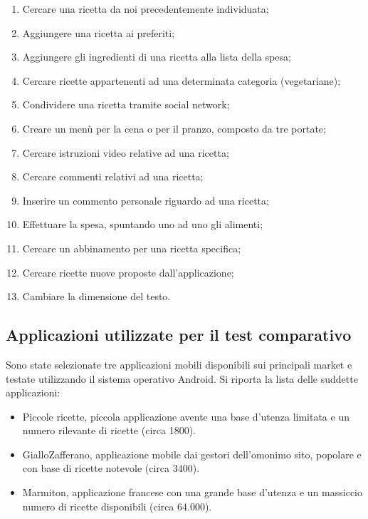 \begin{enumerate}
	\item Cercare una ricetta da noi precedentemente individuata;
	\item Aggiungere una ricetta ai preferiti;
	\item Aggiungere gli ingredienti di una ricetta alla lista della spesa;
	\item Cercare ricette appartenenti ad una determinata categoria
		(vegetariane);
	\item Condividere una ricetta tramite social network;
	\item Creare un menù per la cena o per il pranzo, composto da tre portate;
	\item Cercare istruzioni video relative ad una ricetta;
	\item Cercare commenti relativi ad una ricetta;
	\item Inserire un commento personale riguardo ad una ricetta;
	\item Effettuare la spesa, spuntando uno ad uno gli alimenti;
	\item Cercare un abbinamento per una ricetta specifica;
	\item Cercare ricette nuove proposte dall'applicazione;
	\item Cambiare la dimensione del testo.
\end{enumerate}

\subsection{Applicazioni utilizzate per il test comparativo}
Sono state selezionate tre applicazioni mobili disponibili sui principali market
e testate utilizzando il sistema operativo Android.  Si riporta la lista delle
suddette applicazioni:
\begin{itemize}
	\item Piccole ricette\cite{PiccoleRicette}, piccola applicazione avente una base d'utenza
	limitata e un numero rilevante di ricette (circa 1800).
\item GialloZafferano\cite{GialloZafferano}, applicazione mobile dai gestori dell'omonimo
	sito, popolare e con base di ricette notevole (circa 3400).
\item Marmiton\cite{Marmiton}, applicazione francese con una grande base d'utenza e
	un massiccio numero di ricette disponibili (circa 64.000).
\end{itemize}

